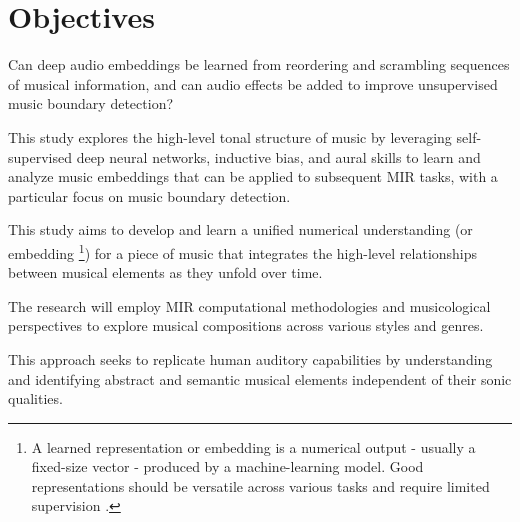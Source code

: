 \section{Objectives}

Can deep audio embeddings be learned from reordering and scrambling sequences of musical information, and can audio effects be added to improve unsupervised music boundary detection?

This study explores the high-level tonal structure of music by leveraging self-supervised deep neural networks, inductive bias, and aural skills to learn and analyze music embeddings that can be applied to subsequent MIR tasks, with a particular focus on music boundary detection.

This study aims to develop and learn a unified numerical understanding (or embedding \footnote{A learned representation or embedding is a numerical output - usually a fixed-size vector - produced by a machine-learning model. Good representations should be versatile across various tasks and require limited supervision \cite{Turian2022HEAR:Representations}.}) for a piece of music that integrates the high-level relationships between musical elements as they unfold over time.

The research will employ MIR computational methodologies and musicological perspectives to explore musical compositions across various styles and genres.

This approach seeks to replicate human auditory capabilities by understanding and identifying abstract and semantic musical elements independent of their sonic qualities.